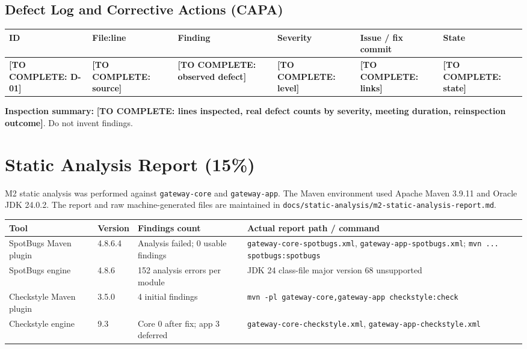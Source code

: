 \documentclass[11pt,a4paper]{article}
\newcommand{\todo}[1]{\textcolor{red!70!black}{\textbf{[TO COMPLETE: #1]}}}
\newcommand{\evidence}[1]{\texttt{#1}}
\begin{document}
\subsection{Defect Log and Corrective Actions (CAPA)}
\begin{longtable}{L{1.2cm} L{2.6cm} L{2.5cm} L{1.6cm} L{2.5cm} L{2cm}}\toprule
\textbf{ID} & \textbf{File:line} & \textbf{Finding} & \textbf{Severity} & \textbf{Issue / fix commit} & \textbf{State}\\\midrule\endhead
\todo{D-01} & \todo{source} & \todo{observed defect} & \todo{level} & \todo{links} & \todo{state}\\\bottomrule\end{longtable}
\textbf{Inspection summary:} \todo{lines inspected, real defect counts by severity, meeting duration, reinspection outcome}. Do not invent findings.

\section{Static Analysis Report (15\%)}\label{sec:static}
M2 static analysis was performed against \texttt{gateway-core} and \texttt{gateway-app}. The Maven environment used Apache Maven 3.9.11 and Oracle JDK 24.0.2. The report and raw machine-generated files are maintained in \evidence{docs/static-analysis/m2-static-analysis-report.md}.\par
\begin{longtable}{L{3cm} L{2.2cm} L{2.7cm} L{4.4cm}}\toprule
\textbf{Tool} & \textbf{Version} & \textbf{Findings count} & \textbf{Actual report path / command}\\\midrule\endhead
SpotBugs Maven plugin & 4.8.6.4 & Analysis failed; 0 usable findings & \evidence{gateway-core-spotbugs.xml}, \evidence{gateway-app-spotbugs.xml}; \texttt{mvn ... spotbugs:spotbugs}\\
SpotBugs engine & 4.8.6 & 152 analysis errors per module & JDK 24 class-file major version 68 unsupported\\
Checkstyle Maven plugin & 3.5.0 & 4 initial findings & \texttt{mvn -pl gateway-core,gateway-app checkstyle:check}\\
Checkstyle engine & 9.3 & Core 0 after fix; app 3 deferred & \evidence{gateway-core-checkstyle.xml}, \evidence{gateway-app-checkstyle.xml}\\\bottomrule\end{longtable}
\end{document}
